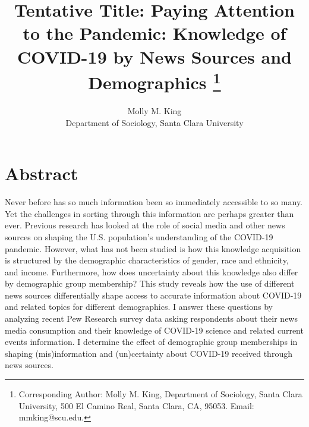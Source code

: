 \documentclass[11pt]{article}
\begin{document}

\title{Tentative Title: Paying Attention to the Pandemic: Knowledge of COVID-19 by News Sources and Demographics
\footnote{Corresponding Author: Molly M. King,
          Department of Sociology, Santa Clara University,
          500 El Camino Real, Santa Clara, CA, 95053.
          Email: mmking@scu.edu.}}

\author{Molly M. King \\ Department of Sociology, Santa Clara University}
\date{}

\clearpage\maketitle
\thispagestyle{empty}

\newpage
\hypertarget{abstract}{%
\section{Abstract}\label{sec:abstract}}
\setcounter{page}{1} %

Never before has so much information been so immediately accessible to
so many. Yet the challenges in sorting through this information are perhaps
greater than ever. Previous research has looked at the role of social media and
other news sources on shaping the U.S. population’s understanding of the COVID-19
pandemic. However, what has not been studied is how this knowledge acquisition
is structured by the demographic characteristics of gender, race and ethnicity, and
income. Furthermore, how does uncertainty about this knowledge also differ by
demographic group membership? This study reveals how the use of
different news sources differentially shape access to accurate information about
COVID-19 and related topics for different demographics. I answer these questions
by analyzing recent Pew Research survey data asking respondents about their news
media consumption and their knowledge of COVID-19 science and related current
events information. I determine the effect of demographic group memberships in
shaping (mis)information and (un)certainty about COVID-19 received through news sources.
\end{document}
